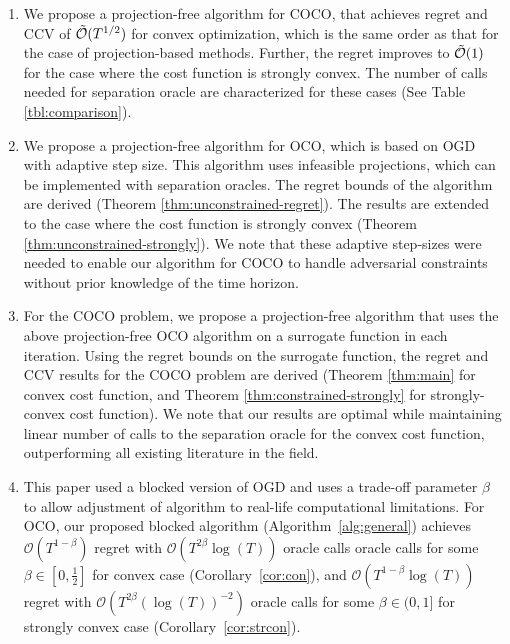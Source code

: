 \documentclass[twoside,11pt,]{article}
\newcommand{\op}[1]{\operatorname{#1}}
\newcommand{\C}[1]{\mathcal{#1}}
\begin{document}
\vspace{-.15in}
\begin{enumerate}[leftmargin=*,itemsep=2pt, parsep=0pt]
\item We propose a projection-free  algorithm for COCO, that achieves regret and CCV of $\Tilde{\C{O}}(T^{1/2})$ for convex optimization, which is the same order as that for the case of projection-based methods. Further, the regret improves to $\Tilde{\C{O}}(1)$ for the case where the cost function is strongly convex. The number of calls needed for separation oracle are characterized for these cases (See Table \ref{tbl:comparison}). 
    
\item We propose a projection-free algorithm for OCO, which is based on OGD with adaptive step size. This algorithm uses infeasible projections, which can be implemented with separation oracles. The regret bounds of the algorithm are derived (Theorem \ref{thm:unconstrained-regret}). The results are extended to the case where the cost function is strongly convex (Theorem \ref{thm:unconstrained-strongly}). We note that these adaptive step-sizes were needed to enable our algorithm for COCO to handle adversarial constraints without prior knowledge of the time horizon.



\item For the COCO problem, we propose a projection-free algorithm that uses the above projection-free OCO algorithm on a surrogate function in each iteration. Using the regret bounds on the surrogate function, the regret and CCV results for the COCO problem are derived (Theorem \ref{thm:main} for convex cost function, and Theorem \ref{thm:constrained-strongly} for strongly-convex cost function). We note that our results are optimal while maintaining linear number of calls to the separation oracle for the convex cost function, outperforming all existing literature in the field.

\item This paper used a  blocked version of OGD and uses a trade-off parameter $\beta$ to allow adjustment of algorithm to real-life computational limitations. For OCO, our proposed blocked algorithm (Algorithm~\ref{alg:general}) achieves $\C{O}(T^{1-\beta})$ regret with $\C{O}(T^{2\beta}\op{log}(T))$ oracle calls oracle calls for some $\beta\in[0,\frac{1}{2}]$ for convex case (Corollary~\ref{cor:con}), and $\C{O}(T^{1-\beta}\op{log}(T))$ regret with $\C{O}(T^{2\beta}(\log(T))^{-2})$ oracle calls for some $\beta\in(0,1]$ for strongly convex case (Corollary~\ref{cor:strcon}).


\end{enumerate}
\end{document}
